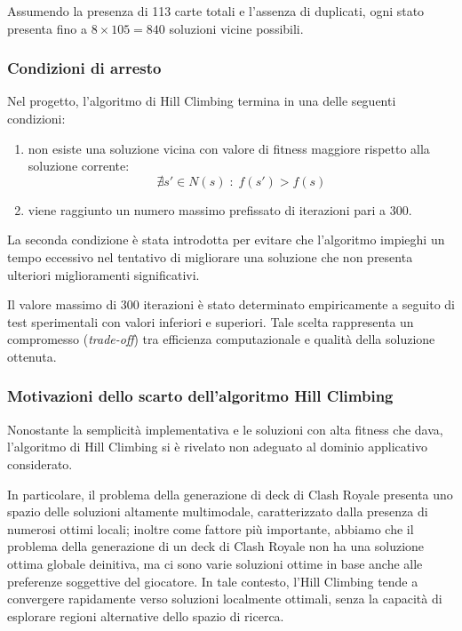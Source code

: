 \documentclass{article}
\begin{document}
Assumendo la presenza di 113 carte totali e l’assenza di duplicati, ogni stato presenta fino a $8 \times 105 = 840$ soluzioni vicine possibili.

\subsubsection{Condizioni di arresto}

Nel progetto, l’algoritmo di Hill Climbing termina in una delle seguenti condizioni:

\begin{enumerate}
    \item non esiste una soluzione vicina con valore di fitness maggiore rispetto alla soluzione corrente:
    \[
    \nexists s' \in N(s) \; : \; f(s') > f(s)
    \]
    \item viene raggiunto un numero massimo prefissato di iterazioni pari a 300.
\end{enumerate}

La seconda condizione è stata introdotta per evitare che l’algoritmo impieghi un tempo eccessivo nel tentativo di migliorare una soluzione che non presenta ulteriori miglioramenti significativi.

Il valore massimo di 300 iterazioni è stato determinato empiricamente a seguito di test sperimentali con valori inferiori e superiori. 
Tale scelta rappresenta un compromesso (\textit{trade-off}) tra efficienza computazionale e qualità della soluzione ottenuta.

\subsubsection{Motivazioni dello scarto dell’algoritmo Hill Climbing}

Nonostante la semplicità implementativa e le soluzioni con alta fitness che dava, l’algoritmo di Hill Climbing si è rivelato non adeguato al dominio applicativo considerato.

In particolare, il problema della generazione di deck di Clash Royale presenta uno spazio delle soluzioni altamente multimodale, caratterizzato dalla presenza di numerosi ottimi locali; inoltre come  fattore più importante, abbiamo che il problema della generazione di un deck di Clash Royale non ha una soluzione ottima globale deinitiva, ma ci sono varie soluzioni ottime in base anche alle preferenze soggettive del giocatore.
In tale contesto, l’Hill Climbing tende a convergere rapidamente verso soluzioni localmente ottimali, senza la capacità di esplorare regioni alternative dello spazio di ricerca.
\end{document}
